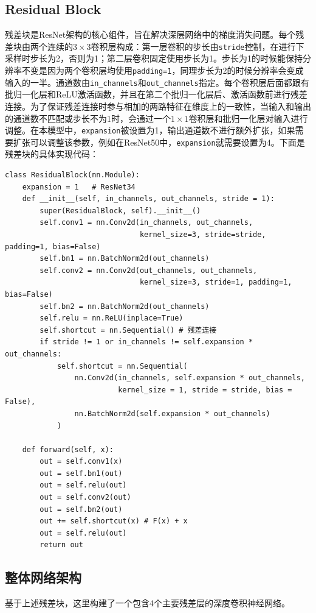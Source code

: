 \documentclass[11pt]{article}
\begin{document}
	\subsection{Residual Block}
	残差块是ResNet架构的核心组件，旨在解决深层网络中的梯度消失问题。每个残差块由两个连续的$3\times 3$卷积层构成：第一层卷积的步长由\lstinline|stride|控制，在进行下采样时步长为2，否则为1；第二层卷积固定使用步长为1。步长为1的时候能保持分辨率不变是因为两个卷积层均使用\lstinline|padding=1|，同理步长为2的时候分辨率会变成输入的一半。通道数由\lstinline|in_channels|和\lstinline|out_channels|指定。每个卷积层后面都跟有批归一化层和ReLU激活函数，并且在第二个批归一化层后、激活函数前进行残差连接。为了保证残差连接时参与相加的两路特征在维度上的一致性，当输入和输出的通道数不匹配或步长不为1时，会通过一个$1\times 1$卷积层和批归一化层对输入进行调整。在本模型中，\lstinline|expansion|被设置为1，输出通道数不进行额外扩张，如果需要扩张可以调整该参数，例如在ResNet50中，\lstinline|expansion|就需要设置为4。下面是残差块的具体实现代码：
	\begin{lstlisting}
class ResidualBlock(nn.Module):
    expansion = 1	# ResNet34
    def __init__(self, in_channels, out_channels, stride = 1):
        super(ResidualBlock, self).__init__()
        self.conv1 = nn.Conv2d(in_channels, out_channels, 
                               kernel_size=3, stride=stride, padding=1, bias=False)
        self.bn1 = nn.BatchNorm2d(out_channels)
        self.conv2 = nn.Conv2d(out_channels, out_channels, 
                               kernel_size=3, stride=1, padding=1, bias=False)
        self.bn2 = nn.BatchNorm2d(out_channels)
        self.relu = nn.ReLU(inplace=True)
        self.shortcut = nn.Sequential()	# 残差连接
        if stride != 1 or in_channels != self.expansion * out_channels:
            self.shortcut = nn.Sequential(
                nn.Conv2d(in_channels, self.expansion * out_channels, 
                          kernel_size = 1, stride = stride, bias = False),
                nn.BatchNorm2d(self.expansion * out_channels)
            )
            
    def forward(self, x):
        out = self.conv1(x)
        out = self.bn1(out)
        out = self.relu(out)
        out = self.conv2(out)
        out = self.bn2(out)
        out += self.shortcut(x) # F(x) + x
        out = self.relu(out)
        return out
	\end{lstlisting}
	\subsection{整体网络架构}
	基于上述残差块，这里构建了一个包含4个主要残差层的深度卷积神经网络。
	
\end{document}
